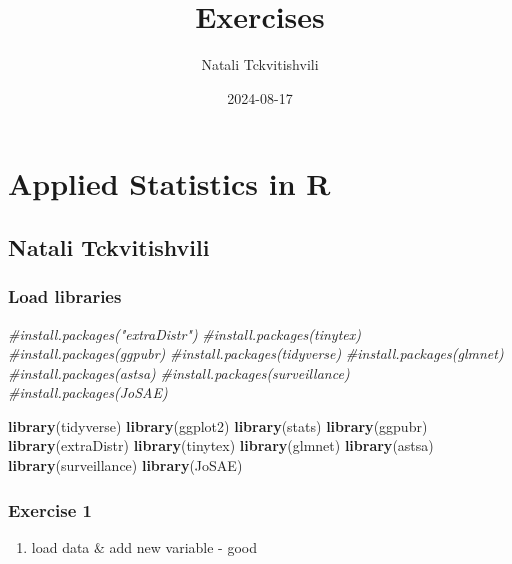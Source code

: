 \documentclass[
]{article}
\title{Exercises}
\author{Natali Tckvitishvili}
\date{2024-08-17}
\newenvironment{Shaded}{\begin{snugshade}}{\end{snugshade}}
\newcommand{\CommentTok}[1]{\textcolor[rgb]{0.56,0.35,0.01}{\textit{#1}}}
\newcommand{\FunctionTok}[1]{\textcolor[rgb]{0.13,0.29,0.53}{\textbf{#1}}}
\newcommand{\NormalTok}[1]{#1}
\providecommand{\tightlist}{%
  \setlength{\itemsep}{0pt}\setlength{\parskip}{0pt}}
\begin{document}
\maketitle

\section{Applied Statistics in R}\label{applied-statistics-in-r}

\subsection{Natali Tckvitishvili}\label{natali-tckvitishvili}

\subsubsection{Load libraries}\label{load-libraries}

\begin{Shaded}
\begin{Highlighting}[]
\CommentTok{\#install.packages("extraDistr")}
\CommentTok{\#install.packages(\textquotesingle{}tinytex\textquotesingle{})}
\CommentTok{\#install.packages(\textquotesingle{}ggpubr\textquotesingle{})}
\CommentTok{\#install.packages(\textquotesingle{}tidyverse\textquotesingle{})}
\CommentTok{\#install.packages(\textquotesingle{}glmnet\textquotesingle{})}
\CommentTok{\#install.packages(\textquotesingle{}astsa\textquotesingle{})}
\CommentTok{\#install.packages(\textquotesingle{}surveillance\textquotesingle{})}
\CommentTok{\#install.packages(\textquotesingle{}JoSAE\textquotesingle{})}

\FunctionTok{library}\NormalTok{(tidyverse)}
\FunctionTok{library}\NormalTok{(ggplot2)}
\FunctionTok{library}\NormalTok{(stats)}
\FunctionTok{library}\NormalTok{(ggpubr)}
\FunctionTok{library}\NormalTok{(extraDistr)}
\FunctionTok{library}\NormalTok{(tinytex)}
\FunctionTok{library}\NormalTok{(glmnet)}
\FunctionTok{library}\NormalTok{(astsa)}
\FunctionTok{library}\NormalTok{(surveillance)}
\FunctionTok{library}\NormalTok{(JoSAE)}
\end{Highlighting}
\end{Shaded}

\subsubsection{Exercise 1}\label{exercise-1}

\begin{enumerate}
\def\labelenumi{\alph{enumi}.}
\tightlist
\item
  load data \& add new variable - good
\end{enumerate}
\end{document}
